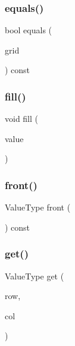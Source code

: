 \mbox{\label{classSparseGrid_a900e9c2eb274257965a3d2160c73d9ff}} 
\subsubsection{\texorpdfstring{equals()}{equals()}}
{\footnotesize\ttfamily bool equals (\begin{DoxyParamCaption}\item[{const \mbox{\hyperlink{classSparseGrid}{Sparse\+Grid}}$<$ Value\+Type $>$ \&}]{grid }\end{DoxyParamCaption}) const}

\mbox{\label{classSparseGrid_ac8f8ff1a5d0997596cbedbc2162e4649}} 
\subsubsection{\texorpdfstring{fill()}{fill()}}
{\footnotesize\ttfamily void fill (\begin{DoxyParamCaption}\item[{const Value\+Type \&}]{value }\end{DoxyParamCaption})}

\mbox{\label{classSparseGrid_abaa174a9d74f7e7e38d4944fa43b5a33}} 
\subsubsection{\texorpdfstring{front()}{front()}}
{\footnotesize\ttfamily Value\+Type front (\begin{DoxyParamCaption}{ }\end{DoxyParamCaption}) const}

\mbox{\label{classSparseGrid_a49fcb88bae29483f4cb0858f29f6384e}} 
\subsubsection{\texorpdfstring{get()}{get()}\hspace{0.1cm}{\footnotesize\ttfamily [1/4]}}
{\footnotesize\ttfamily Value\+Type get (\begin{DoxyParamCaption}\item[{int}]{row,  }\item[{int}]{col }\end{DoxyParamCaption})}

